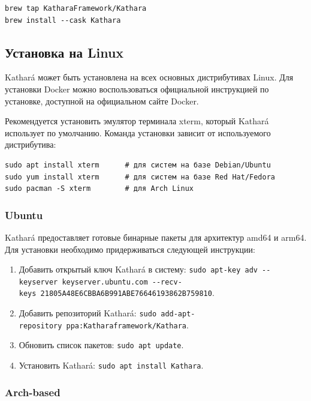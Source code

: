 \documentclass[
  english,
  russian,
  12pt,
  a4paper,
]{phdthesr}
\providecommand{\tightlist}{%
  \setlength{\itemsep}{0pt}\setlength{\parskip}{0pt}}
\begin{document}
\begin{verbatim}
brew tap KatharaFramework/Kathara
brew install --cask Kathara
\end{verbatim}

\subsection{Установка на
Linux}\label{ux443ux441ux442ux430ux43dux43eux432ux43aux430-ux43dux430-linux}

Kathará может быть установлена на всех основных дистрибутивах Linux. Для
установки Docker можно воспользоваться официальной инструкцией по
установке, доступной на официальном сайте Docker.

Рекомендуется установить эмулятор терминала xterm, который Kathará
использует по умолчанию. Команда установки зависит от используемого
дистрибутива:

\begin{verbatim}
sudo apt install xterm      # для систем на базе Debian/Ubuntu
sudo yum install xterm      # для систем на базе Red Hat/Fedora
sudo pacman -S xterm        # для Arch Linux
\end{verbatim}

\subsubsection{Ubuntu}\label{ubuntu}

Kathará предоставляет готовые бинарные пакеты для архитектур amd64 и
arm64. Для установки необходимо придерживаться следующей инструкции:

\begin{enumerate}
\def\labelenumi{\arabic{enumi}.}
\tightlist
\item
  Добавить открытый ключ Kathará в систему:
  \texttt{sudo\ apt-key\ adv\ -\/-keyserver\ keyserver.ubuntu.com\ -\/-recv-keys\ 21805A48E6CBBA6B991ABE76646193862B759810}.
\item
  Добавить репозиторий Kathará:
  \texttt{sudo\ add-apt-repository\ ppa:Katharaframework/Kathara}.
\item
  Обновить список пакетов: \texttt{sudo\ apt\ update}.
\item
  Установить Kathará: \texttt{sudo\ apt\ install\ Kathara}.
\end{enumerate}

\subsubsection{Arch-based}\label{arch-based}
\end{document}
